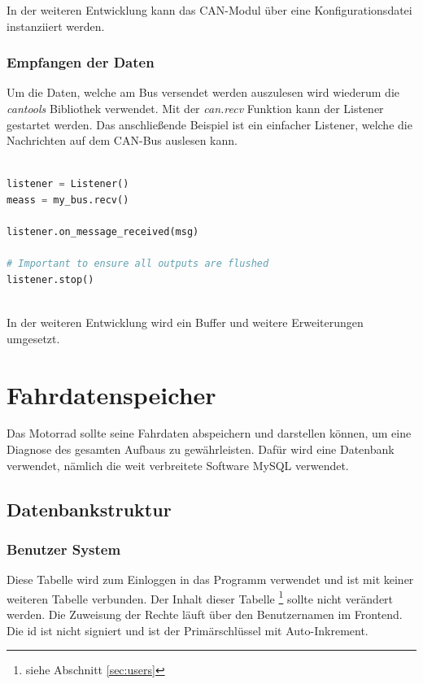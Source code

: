 In der weiteren Entwicklung kann das CAN-Modul über eine Konfigurationsdatei instanziiert werden.

\subsubsection{Empfangen der Daten}
Um die Daten, welche am Bus versendet werden auszulesen wird wiederum die \textit{cantools} Bibliothek verwendet. Mit der \textit{can.recv} Funktion kann der Listener gestartet werden. Das anschließende Beispiel ist ein einfacher Listener, welche die Nachrichten auf dem CAN-Bus auslesen kann.
  
\begin{lstlisting}[language=Python, caption={Konfigurieren des CAN Adapters in Code},captionpos=b]
	
listener = Listener()
meass = my_bus.recv()

listener.on_message_received(msg)

# Important to ensure all outputs are flushed
listener.stop()
	
\end{lstlisting}

In der weiteren Entwicklung wird ein Buffer und weitere Erweiterungen umgesetzt.

\newpage


\section{Fahrdatenspeicher}

Das Motorrad sollte seine Fahrdaten abspeichern und darstellen können, um eine Diagnose des gesamten Aufbaus zu gewährleisten. Dafür wird eine Datenbank verwendet, nämlich die weit verbreitete Software MySQL verwendet.

\subsection{Datenbankstruktur}

\subsubsection{Benutzer System}

Diese Tabelle wird zum Einloggen in das Programm verwendet und ist mit keiner weiteren Tabelle verbunden. Der Inhalt dieser Tabelle \footnote{siehe Abschnitt \ref{sec:users}} sollte nicht verändert werden. Die Zuweisung der Rechte läuft über den Benutzernamen im Frontend. Die id ist nicht signiert und ist der Primärschlüssel mit Auto-Inkrement.

